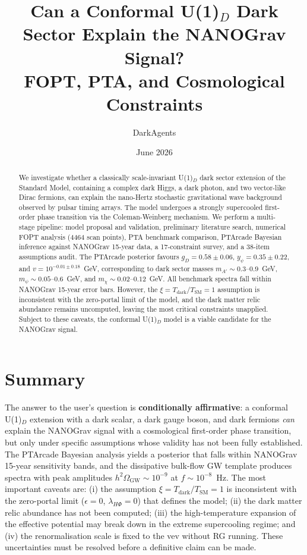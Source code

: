 \documentclass[12pt,a4paper]{article}
\title{Can a Conformal U(1)$_D$ Dark Sector Explain the NANOGrav Signal?\\
  \large FOPT, PTA, and Cosmological Constraints}
\author{DarkAgents}
\date{June 2026}
\begin{document}
\maketitle

\begin{abstract}
We investigate whether a classically scale-invariant U(1)$_D$ dark sector extension of the Standard Model, containing a complex dark Higgs, a dark photon, and two vector-like Dirac fermions, can explain the nano-Hertz stochastic gravitational wave background observed by pulsar timing arrays. The model undergoes a strongly supercooled first-order phase transition via the Coleman-Weinberg mechanism. We perform a multi-stage pipeline: model proposal and validation, preliminary literature search, numerical FOPT analysis (4464 scan points), PTA benchmark comparison, PTArcade Bayesian inference against NANOGrav 15-year data, a 17-constraint survey, and a 38-item assumptions audit. The PTArcade posterior favours $g_D = 0.58 \pm 0.06$, $y_\psi = 0.35 \pm 0.22$, and $v = 10^{-0.01 \pm 0.18}$~GeV, corresponding to dark sector masses $m_{A'} \sim 0.3$--$0.9$~GeV, $m_\psi \sim 0.05$--$0.6$~GeV, and $m_\chi \sim 0.02$--$0.12$~GeV. All benchmark spectra fall within NANOGrav 15-year error bars. However, the $\xi = T_\text{dark}/T_\text{SM} = 1$ assumption is inconsistent with the zero-portal limit of the model, and the dark matter relic abundance remains uncomputed, leaving the most critical constraints unapplied. Subject to these caveats, the conformal U(1)$_D$ model is a viable candidate for the NANOGrav signal.
\end{abstract}

\section{Summary}
\label{sec:summary}

The answer to the user's question is \textbf{conditionally affirmative}: a conformal U(1)$_D$ extension with a dark scalar, a dark gauge boson, and dark fermions \emph{can} explain the NANOGrav signal with a cosmological first-order phase transition, but only under specific assumptions whose validity has not been fully established. The PTArcade Bayesian analysis yields a posterior that falls within NANOGrav 15-year sensitivity bands, and the dissipative bulk-flow GW template produces spectra with peak amplitudes $h^2\Omega_\text{GW} \sim 10^{-9}$ at $f \sim 10^{-8}$~Hz. The most important caveats are: (i) the assumption $\xi = T_\text{dark}/T_\text{SM} = 1$ is inconsistent with the zero-portal limit ($\epsilon = 0$, $\lambda_{H\Phi} = 0$) that defines the model; (ii) the dark matter relic abundance has not been computed; (iii) the high-temperature expansion of the effective potential may break down in the extreme supercooling regime; and (iv) the renormalisation scale is fixed to the vev without RG running. These uncertainties must be resolved before a definitive claim can be made.
\end{document}
